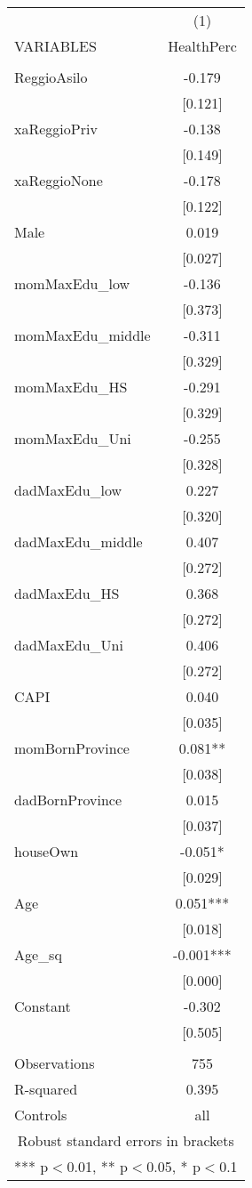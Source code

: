 \documentclass[]{article}
\begin{document}
\begin{tabular}{lc} \hline
 & (1) \\
VARIABLES & HealthPerc \\ \hline
 &  \\
ReggioAsilo & -0.179 \\
 & [0.121] \\
xaReggioPriv & -0.138 \\
 & [0.149] \\
xaReggioNone & -0.178 \\
 & [0.122] \\
Male & 0.019 \\
 & [0.027] \\
momMaxEdu\_low & -0.136 \\
 & [0.373] \\
momMaxEdu\_middle & -0.311 \\
 & [0.329] \\
momMaxEdu\_HS & -0.291 \\
 & [0.329] \\
momMaxEdu\_Uni & -0.255 \\
 & [0.328] \\
dadMaxEdu\_low & 0.227 \\
 & [0.320] \\
dadMaxEdu\_middle & 0.407 \\
 & [0.272] \\
dadMaxEdu\_HS & 0.368 \\
 & [0.272] \\
dadMaxEdu\_Uni & 0.406 \\
 & [0.272] \\
CAPI & 0.040 \\
 & [0.035] \\
momBornProvince & 0.081** \\
 & [0.038] \\
dadBornProvince & 0.015 \\
 & [0.037] \\
houseOwn & -0.051* \\
 & [0.029] \\
Age & 0.051*** \\
 & [0.018] \\
Age\_sq & -0.001*** \\
 & [0.000] \\
Constant & -0.302 \\
 & [0.505] \\
 &  \\
Observations & 755 \\
R-squared & 0.395 \\
 Controls & all \\ \hline
\multicolumn{2}{c}{ Robust standard errors in brackets} \\
\multicolumn{2}{c}{ *** p$<$0.01, ** p$<$0.05, * p$<$0.1} \\
\end{tabular}
\end{document}

